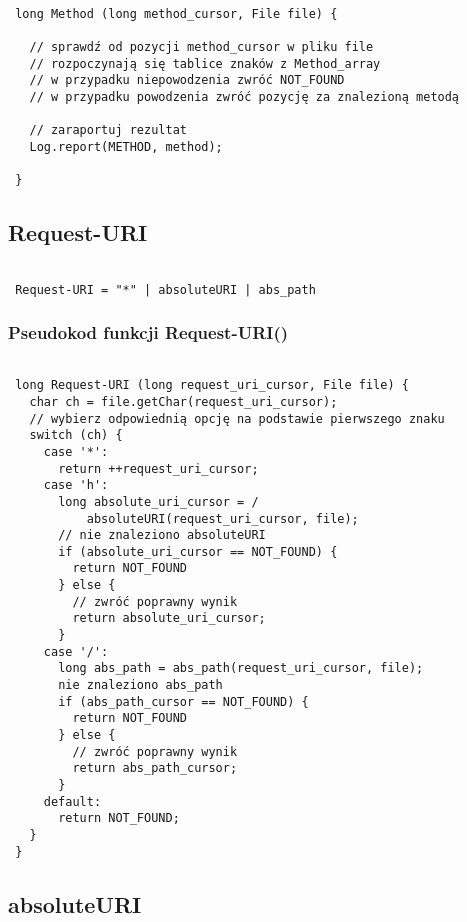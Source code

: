 \documentclass[a4paper,11pt]{report}
\begin{document}
\begin{lstlisting}

 long Method (long method_cursor, File file) {
   
   // sprawdź od pozycji method_cursor w pliku file
   // rozpoczynają się tablice znaków z Method_array
   // w przypadku niepowodzenia zwróć NOT_FOUND
   // w przypadku powodzenia zwróć pozycję za znalezioną metodą 
   
   // zaraportuj rezultat
   Log.report(METHOD, method);
 
 }

\end{lstlisting}

\subsection{Request-URI}

\begin{lstlisting}

 Request-URI = "*" | absoluteURI | abs_path

\end{lstlisting}

\subsubsection{Pseudokod funkcji Request-URI()}

\begin{lstlisting}

 long Request-URI (long request_uri_cursor, File file) {
   char ch = file.getChar(request_uri_cursor);
   // wybierz odpowiednią opcję na podstawie pierwszego znaku   
   switch (ch) {
     case '*':
       return ++request_uri_cursor;
     case 'h':
       long absolute_uri_cursor = /
           absoluteURI(request_uri_cursor, file);
       // nie znaleziono absoluteURI
       if (absolute_uri_cursor == NOT_FOUND) {
         return NOT_FOUND
       } else {
         // zwróć poprawny wynik
         return absolute_uri_cursor;       
       }
     case '/':
       long abs_path = abs_path(request_uri_cursor, file);
       nie znaleziono abs_path
       if (abs_path_cursor == NOT_FOUND) {
         return NOT_FOUND
       } else {
         // zwróć poprawny wynik
         return abs_path_cursor;       
       }
     default:
       return NOT_FOUND;
   }  
 }

\end{lstlisting}

\subsection{absoluteURI}
\end{document}
